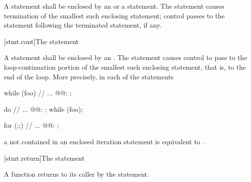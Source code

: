 \pnum
A  statement shall be enclosed by
%
%
an  or
a  statement.
The  statement causes
termination of the smallest such enclosing statement;
control passes to the statement following the
terminated statement, if any.

[stmt.cont]{The  statement}%

\pnum
A 
statement shall be enclosed by an
%
.
The  statement
causes control to pass to the loop-continuation portion of the
smallest such enclosing statement, that is, to the end
of the loop. More precisely, in each of the statements

\begin{minipage}{.30\hsize}
\begin{codeblock}
while (foo) {
  {
    // ...
  }
@@: ;
}
\end{codeblock}
\end{minipage}
\begin{minipage}{.30\hsize}
\begin{codeblock}
do {
  {
    // ...
  }
@@: ;
} while (foo);
\end{codeblock}
\end{minipage}
\begin{minipage}{.30\hsize}
\begin{codeblock}
for (;;) {
  {
    // ...
  }
@@: ;
}
\end{codeblock}
\end{minipage}

a  not contained in an enclosed iteration statement is
equivalent to  .

[stmt.return]{The  statement}%
%
%

\pnum
A function returns to its caller by the  statement.

